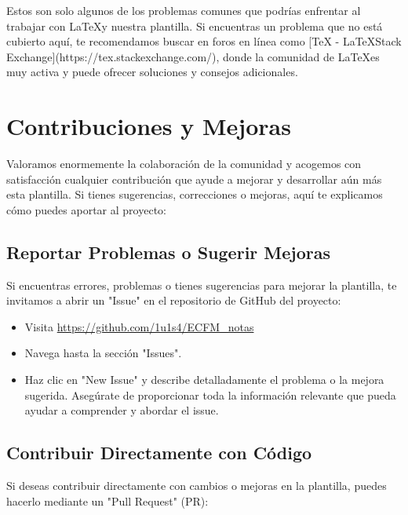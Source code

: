 \documentclass[11pt]{article}
\begin{document}
Estos son solo algunos de los problemas comunes que podrías enfrentar al trabajar con \LaTeX y nuestra plantilla. Si encuentras un problema que no está cubierto aquí, te recomendamos buscar en foros en línea como [TeX - \LaTeX Stack Exchange](https://tex.stackexchange.com/), donde la comunidad de \LaTeX es muy activa y puede ofrecer soluciones y consejos adicionales.


\section{Contribuciones y Mejoras}

Valoramos enormemente la colaboración de la comunidad y acogemos con satisfacción cualquier contribución que ayude a mejorar y desarrollar aún más esta plantilla. Si tienes sugerencias, correcciones o mejoras, aquí te explicamos cómo puedes aportar al proyecto:

\subsection{Reportar Problemas o Sugerir Mejoras}

Si encuentras errores, problemas o tienes sugerencias para mejorar la plantilla, te invitamos a abrir un "Issue" en el repositorio de GitHub del proyecto:

\begin{itemize}
\item Visita \url{https://github.com/1u1s4/ECFM_notas}
\item Navega hasta la sección "Issues".
\item Haz clic en "New Issue" y describe detalladamente el problema o la mejora sugerida. Asegúrate de proporcionar toda la información relevante que pueda ayudar a comprender y abordar el issue.
\end{itemize}

\subsection{Contribuir Directamente con Código}

Si deseas contribuir directamente con cambios o mejoras en la plantilla, puedes hacerlo mediante un "Pull Request" (PR):
\end{document}

